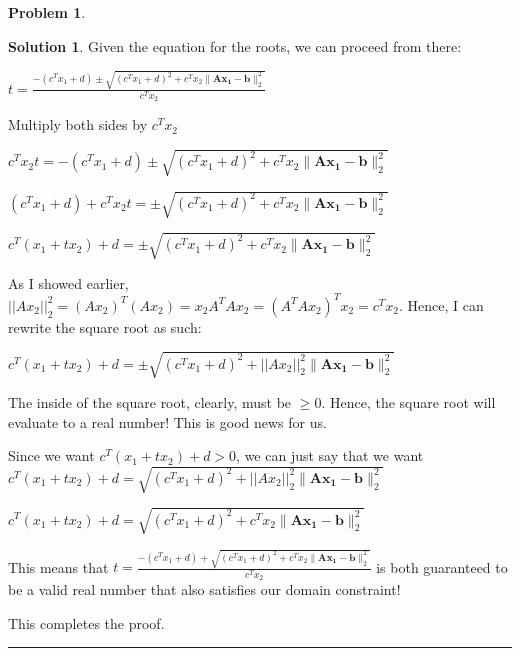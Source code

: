 \documentclass{article}
\theoremstyle{definition}
\newtheorem{problem}{Problem}
\def\fline{\rule{0.75\linewidth}{0.5pt}}
\newcommand{\finishline}{\begin{center}\fline\end{center}}
\newtheorem*{solution*}{Solution}
\newenvironment{solution}{\begin{solution*}}{{\finishline} \end{solution*}}
\begin{document}
\begin{problem}
\begin{enumerate}
\begin{solution}
        Given the equation for the roots, we can proceed from there: \newline 

        $t = \frac{-(c^Tx_1 + d) \pm \sqrt{(c^Tx_1 + d)^2 + c^Tx_2 \|\mathbf{Ax_1 - b}\|^2_2}}{c^Tx_2}$ \newline 

        Multiply both sides by $c^Tx_2$ \newline 

        $c^Tx_2 t = -(c^Tx_1 + d) \pm \sqrt{(c^Tx_1 + d)^2 + c^Tx_2 \|\mathbf{Ax_1 - b}\|^2_2}$ \newline 

        $(c^Tx_1 + d) + c^Tx_2 t = \pm \sqrt{(c^Tx_1 + d)^2 + c^Tx_2 \|\mathbf{Ax_1 - b}\|^2_2}$ \newline 

        $c^T(x_1 + tx_2) + d = \pm \sqrt{(c^Tx_1 + d)^2 + c^Tx_2 \|\mathbf{Ax_1 - b}\|^2_2}$

        As I showed earlier, $||Ax_2||^2_2 = (Ax_2)^T(Ax_2) = x_2A^TAx_2 = (A^TAx_2)^T x_2 = c^T x_2$. Hence, I can rewrite the square root as such: \newline 

        $c^T(x_1 + tx_2) + d = \pm \sqrt{(c^Tx_1 + d)^2 + ||Ax_2||^2_2 \|\mathbf{Ax_1 - b}\|^2_2}$

        The inside of the square root, clearly, must be $\geq 0$. Hence, the square root will evaluate to a real number! This is good news for us. 

        Since we want $c^T(x_1 + tx_2) + d > 0$, we can just say that we want  
        $c^T(x_1 + tx_2) + d =  \sqrt{(c^Tx_1 + d)^2 + ||Ax_2||^2_2 \|\mathbf{Ax_1 - b}\|^2_2}$ \newline 

        $c^T(x_1 + tx_2) + d =  \sqrt{(c^Tx_1 + d)^2 + c^Tx_2 \|\mathbf{Ax_1 - b}\|^2_2}$ \newline 


        This means that $t = \frac{-(c^Tx_1 + d) + \sqrt{(c^Tx_1 + d)^2 + c^Tx_2 \|\mathbf{Ax_1 - b}\|^2_2}}{c^Tx_2}$ is both guaranteed to be a valid real number that also satisfies our domain constraint! 

        This completes the proof. 
        
        
    \end{solution}
\end{enumerate}
\end{problem}
\end{document}
